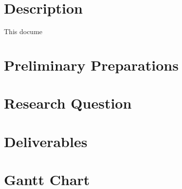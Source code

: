 \documentclass[14pt]{article}
\begin{document}
\maketitle


\section{Description}
This docume

\section{Preliminary Preparations}

\section{Research Question}

\section{Deliverables}

\section{Gantt Chart}
\end{document}
